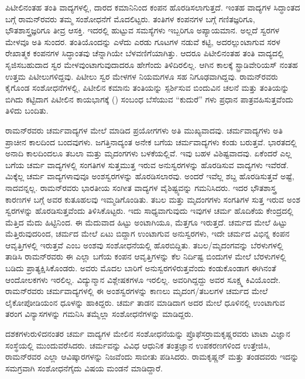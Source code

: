 ಪಿಟೀಲಿನಂತಹ ತಂತಿ ವಾದ್ಯಗಳಲ್ಲಿ, ದಾರದ ಕಮಾನಿನಿಂದ ಕಂಪನ ಹೊರಡಿಸಲಾಗುತ್ತದೆ. ಇಂತಹ ವಾದ್ಯಗಳ ಸಿದ್ಧಾಂತದ ಬಗ್ಗೆ ರಾಮನ್‍ರವರು ತಮ್ಮ ಸಂಶೋಧನೆಗೆ ಮೊದಲಿಟ್ಟರು. ತಂತಿಗಳ ಕಂಪನಗಳ ಬಗ್ಗೆ ಗಣಿತಜ್ಞರಿಗೂ, ಭೌತಶಾಸ್ತ್ರಜ್ಞರಿಗೂ ತೀವ್ರ ಆಸಕ್ತಿ. ಇದರಲ್ಲಿ ಹುಟ್ಟುವ ಸಮಸ್ಯೆಗಳು ಇಬ್ಬರಿಗೂ ಅಪ್ಯಾಯಮಾನ. ಅಲ್ಲದೆ ಸ್ವರಗಳ ಮೇಳವೂ ಅತಿ ಸುಂದರ. ತಂತಿಯೊಂದನ್ನು ಎಳೆದು ಎರಡು ಗೂಟಗಳ ನಡುವೆ ಕಟ್ಟಿ, ಅದರಲ್ಲುಂಟಾಗುವ ಸರಳ ರೇಖಾತ್ಮಕ ಕಂಪನಗಳ ಸಿದ್ಧಾಂತವು ಚೆನ್ನಾಗಿಯೇ ಬೆಳವಣಿಗೆಯಾಗಿತ್ತು. ಆದರೂ ಪಿಟೀಲಿನಂತಹ ತಂತಿ ವಾದ್ಯದಲ್ಲಿ ಸೃಜಿಸಬಹುದಾದ ಸ್ವರ ಮೇಳವುಂಟಾಗುವುದಾದರೂ ಹೇಗೆಂದು ತಿಳಿದಿರಲಿಲ್ಲ. ಆಗಿನ ಕಾಲಕ್ಕೆ ಸ್ಟ್ರಾಡಿವೇರಿಯಸ್ ನಂತಹ ಉತ್ತಮ ಪಿಟೀಲುಗಳಿದ್ದವು. ಪಿಟೀಲು ಸ್ವರ ಮೇಳಗಳ ನಿಯಮಗಳೂ ಸಹ ನಿಗೂಢವಾಗಿದ್ದವು. ರಾಮನ್‍ರವರು ಕೈಗೊಂಡ ಸಂಶೋಧನೆಗಳಲ್ಲಿ, ಪಿಟೀಲಿನ ಕಮಾನು ತಂತಿಯನ್ನು ಸ್ಪರ್ಶಿಸುವ ಬಿಂದುವಿನ ಚಲನೆ ಮತ್ತು ತಂತಿಯನ್ನು ಬಿಗಿದು ಕಟ್ಟಿದಾಗ ಪಿಟೀಲಿನ ಕಾಯಭಾಗಕ್ಕೆ () ಸಂಬಂಧ ಬೆಸೆಯುವ “ಕುದುರೆ” ಗಳು ಪ್ರಧಾನ ಪಾತ್ರವಹಿಸುತ್ತವೆಂದು ತಿಳಿದು ಬಂದಿತು.

\newpage 

ರಾಮನ್‍ರವರು ಚರ್ಮವಾದ್ಯಗಳ ಮೇಲೆ ಮಾಡಿದ ಪ್ರಯೋಗಗಳು ಅತಿ ಮುಖ್ಯವಾದವು. ಚರ್ಮವಾದ್ಯಗಳು ಅತಿ ಪ್ರಾಚೀನ ಕಾಲದಿಂದ ಬಂದವುಗಳು. ಜಗತ್ತಿನಾದ್ಯಂತ ಅನೇಕ ಬಗೆಯ ಚರ್ಮ\-ವಾದ್ಯಗಳು ಕಂಡು ಬರುತ್ತವೆ. ಭಾರತದಲ್ಲಿ ಅನಾದಿ ಕಾಲದಿಂದಲೂ ತಬಲಾ ಮತ್ತು ಮೃದಂಗಗಳು ಬಳಕೆಯಲ್ಲಿವೆ. ಇವು ಬಹಳ ವಿಶಿಷ್ಟವಾದವು. ಏಕೆಂದರೆ ಎಲ್ಲ ಬಗೆಯ ಚರ್ಮ ವಾದ್ಯಗಳಲ್ಲಿ ಸಂಗತಿಗಳ ಸುತ್ತಮುತ್ತ ಇರುವ ಅನುಸ್ವರಗಳನ್ನು ಹೊರಡಿಸುವ ವಾದ್ಯಗಳು ಇವೆರಡೆ. ಮಿಕ್ಕೆಲ್ಲ ಚರ್ಮ ವಾದ್ಯಗಳಾವುವೂ ಅಂಶಸ್ವರಗಳನ್ನು ಹೊರಡಿಸಲಾರವು. ಅಂದರೆ ಇವೆಲ್ಲ ಶಬ್ದ ಹೊರಡಿಸುತ್ತವೆ ಅಷ್ಟೆ, ನಾದವನ್ನಲ್ಲ. ರಾಮನ್‍ರವರು ಭಾರತೀಯ ಸಂಗೀತ ವಾದ್ಯಗಳ ವೈಶಿಷ್ಟ್ಯವನ್ನು ಗಮನಿಸಿದರು. ಇದರ ಭೌತಶಾಸ್ತ್ರ ಕಾರಣಗಳ ಬಗ್ಗೆ ಅವರ ಕುತೂಹಲವು ಇಮ್ಮಡಿಗೊಂಡಿತು. ತಬಲ ಮತ್ತು ಮೃದಂಗಗಳು ಸಂಗತಿಗಳ ಸುತ್ತ ಇರುವ ಅಂಶ ಸ್ವರಗಳನ್ನು ಹೊರಡಿಸುತ್ತವೆಂದು ತಿಳಿಸಿಕೊಟ್ಟರು. ಇದು ಸಾಧ್ಯವಾಗುವುದು ಇವುಗಳ ಚರ್ಮ ಹೊದಿಕೆಯ ಕೇಂದ್ರದಲ್ಲಿ ಮೆತ್ತಿದ ಮೆದು ಹಿಟ್ಟಿನಿಂದ. ಈ ಮೆದುವಾದ ಹಿಟ್ಟು ಅಂಟಾಗಿಯೂ, ಮೆತ್ತಗೂ ಇರುತ್ತದೆ. ಚರ್ಮದ ಮೇಲೆ ಹಿಟ್ಟು ಮೆತ್ತಿರುವುದರಿಂದ, ಚರ್ಮದ ಮೇಲೆ ಏಟು ಬಿದ್ದಾಗ ಉಂಟಾಗುವ ಅನುಸ್ವರಗಳು, ಇದೇ ಚರ್ಮದ ವಿಭಿನ್ನ ಕಂಪನ ಆವೃತ್ತಿಗಳಲ್ಲಿ ಇರುತ್ತವೆ ಎಂಬ ಅಂಶವು ಸಂಶೋಧನೆಯಲ್ಲಿ ಹೊರಬಿದ್ದಿತು. ತಬಲ/ಮೃದಂಗವನ್ನು ಬೆರಳುಗಳಲ್ಲಿ ತಾಡಿಸಿ ರಾಮನ್‍ರವರು ಈ ಎಲ್ಲಾ ಬಗೆಯ ಕಂಪನ ಆವೃತ್ತಿಗಳನ್ನು ಕೆಲ ನಿರ್ದಿಷ್ಟ ಬಿಂದುಗಳ ಮೇಲೆ ಬೆರಳುಗಳಲ್ಲಿ ಬಡಿದು ಪ್ರಾತ್ಯಕ್ಷಿಸಿಕೊಂಡರು. ಅವರು ಮೊದಲ ಬಾರಿಗೆ ಅನುಸ್ವರಗಳಿರುತ್ತವೆಂದು ಕಂಡುಕೊಂಡಾಗ ಈಗಿನಂತೆ ಆಂದೋಲಕಗಳು ಇರಲಿಲ್ಲ. ವಿದ್ಯುನ್ಮಾನ ವಿಶ್ಲೇಷಕಗಳೂ ಇರಲಿಲ್ಲ. ಅವರಿಗಿದ್ದದ್ದು ಅವರ ಸೂಕ್ಷ್ಮ ಕಿವಿಯೊಂದೇ. ರಾಮನ್‍ರವರು ಚರ್ಮವಾದ್ಯಗಳಲ್ಲಿ ಈ ಅಂಶಸ್ವರಗಳನ್ನು ಕಾಣಲು ಮೃದಂಗ/ತಬಲಗಳ ಚರ್ಮದ ಮೇಲೆ ಲೈಕೋಪೋಡಿಯಂನ ಧೂಳನ್ನು ಹಾಕಿದ್ದರು. ಚರ್ಮ ತಾಡನ ಮಾಡಿದಾಗ ಅದರ ಮೇಲೆ ಧೂಳಿನಲ್ಲಿ ಉಂಟಾಗುವ ತರಂಗ ವಿನ್ಯಾಸಗಳನ್ನು ಗಮನಿಸಿ ತಮ್ಮೆಲ್ಲಾ ಸಂಶೋಧನೆಗಳನ್ನು ಮಾಡಿದ್ದರು.

ದಶಕಗಳುರುಳಿದನಂತರ ಚರ್ಮ ವಾದ್ಯಗಳ ಮೇಲಿನ ಸಂಶೋಧನೆಯನ್ನು ಪ್ರೊಫೆಸರ್\break ರಾಮಕೃಷ್ಣರವರು ಟಾಟಾ ವಿಜ್ಞಾನ ಸಂಸ್ಥೆಯಲ್ಲಿ ಮುಂದುವರೆಸಿದರು. ಚರ್ಮವನ್ನು ವಿವಿಧ ಆಧುನಿಕ ತಂತ್ರಜ್ಞಾನ ಉಪಕರಣಗಳಿಂದ ಉತ್ತೇಜಿಸಿ, ರಾಮನ್‍ರವರ ಎಲ್ಲಾ ಆವಿಷ್ಕಾರಗಳನ್ನು ನಿಜವೆಂದು ಸಾಬೀತು ಪಡಿಸಿದರು. ರಾಮಕೃಷ್ಣನ್ ಮತ್ತು ತಂಡದವರು ಇದನ್ನು ಸಮಗ್ರವಾಗಿ ಸಂಶೋಧನೆಗೈದು ವಿಷಯ ಮಂಡನೆ ಮಾಡಿದ್ದಾರೆ.

